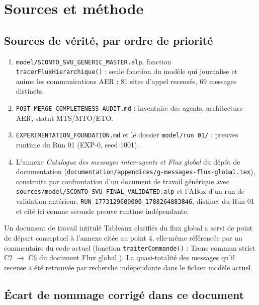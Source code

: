 \documentclass[11pt,a4paper]{article}
\newcommand{\code}[1]{\texttt{#1}}
\begin{document}
\appendix
\newpage

\section{Sources et méthode}
\label{app:sources}

\subsection{Sources de vérité, par ordre de priorité}

\begin{enumerate}
  \item \code{model/\allowbreak{}SCONTO\_SVU\_GENERIC\_MASTER.alp}, fonction \code{tracerFluxHierarchique()} : seule fonction du modèle qui journalise et anime les communications AER ; 81 sites d'appel recensés, 69 messages distincts.
  \item \code{POST\_MERGE\_COMPLETENESS\_AUDIT.md} : inventaire des agents, architecture AER, statut MTS/MTO/ETO.
  \item \code{EXPERIMENTATION\_FOUNDATION.md} et le dossier \code{model/run~01/} : preuves runtime du Run 01 (EXP-0, seed 1001).
  \item L'annexe \emph{Catalogue des messages inter-agents et Flux global} du dépôt de documentation (\code{documentation/appendices/g-messages-flux-global.tex}), construite par confrontation d'un document de travail générique avec \code{sources/\allowbreak{}model/\allowbreak{}SCONTO\_SVU\_\allowbreak{}FINAL\_\allowbreak{}VALIDATED.alp} et l'ABox d'un run de validation antérieur, \code{RUN\_1773129600000\_1788264883846}, distinct du Run 01 et cité ici comme seconde preuve runtime indépendante.
\end{enumerate}

Un document de travail intitulé \og{} Tableaux clarifiés du flux global \fg{} a servi de point de départ conceptuel à l'annexe citée au point 4, elle-même référencée par un commentaire du code actuel (fonction \code{traiterCommande()} : \og{} Tronc commun strict C2 $\to$ C6 du document Flux global \fg{}). La quasi-totalité des messages qu'il recense a été retrouvée par recherche indépendante dans le fichier modèle actuel.

\subsection{Écart de nommage corrigé dans ce document}
\end{document}
